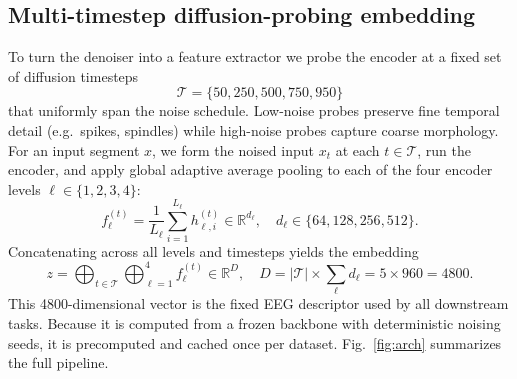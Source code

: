 \documentclass[journal]{IEEEtran}
\begin{document}
\subsection{Multi-timestep diffusion-probing embedding}
\label{sec:embedding}
To turn the denoiser into a feature extractor we probe the encoder at a fixed
set of diffusion timesteps
\begin{equation}
\mathcal T=\{50,250,500,750,950\}
\end{equation}
that uniformly span the noise schedule. Low-noise probes preserve fine temporal
detail (e.g.\ spikes, spindles) while high-noise probes capture coarse
morphology. For an input segment $x$, we form the noised input $x_t$ at each
$t\in\mathcal T$, run the encoder, and apply global adaptive average pooling to
each of the four encoder levels $\ell\in\{1,2,3,4\}$:
\begin{equation}
f^{(t)}_\ell=\frac{1}{L_\ell}\sum_{i=1}^{L_\ell}h^{(t)}_{\ell,i}\in\mathbb R^{d_\ell},
\quad d_\ell\in\{64,128,256,512\}.
\end{equation}
Concatenating across all levels and timesteps yields the embedding
\begin{equation}
z=\bigoplus_{t\in\mathcal T}\bigoplus_{\ell=1}^{4}f^{(t)}_\ell\in\mathbb R^{D},
\quad
D=|\mathcal T|\!\times\!\!\sum_\ell d_\ell = 5\times960 = 4800 .
\end{equation}
This \num{4800}-dimensional vector is the fixed EEG descriptor used by all
downstream tasks. Because it is computed from a frozen backbone with
deterministic noising seeds, it is precomputed and cached once per dataset.
Fig.~\ref{fig:arch} summarizes the full pipeline.
\end{document}
